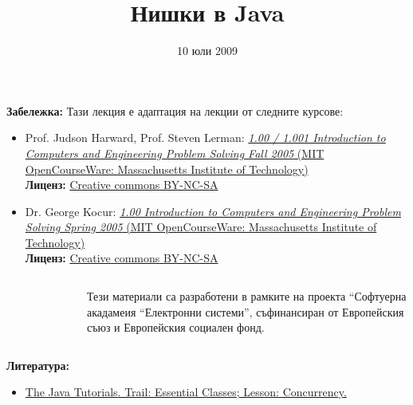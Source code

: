 \documentclass[ignorenonframetext, hyperref=unicode,compress]{beamer}
\title{Нишки в Java}
\date{10 юли 2009}
\begin{document}
\frame{\titlepage}

\begin{frame}
\small
{\bf Забележка:} Тази лекция е адаптация на лекции от следните
курсове:
\begin{itemize}
  \item 
Prof. Judson Harward, Prof. Steven Lerman:
\href{http://ocw.mit.edu/OcwWeb/Civil-and-Environmental-Engineering/1-00Fall-2005/CourseHome/index.htm}{
{\em 1.00 / 1.001 Introduction to Computers and Engineering Problem Solving  Fall 2005} (MIT OpenCourseWare:
Massachusetts Institute of Technology)}\\
{\bf Лиценз:}
\href{http://ocw.mit.edu/OcwWeb/web/terms/terms/index.htm\#cc}{Creative commons
BY-NC-SA}  
\item Dr. George Kocur: 
\href{http://ocw.mit.edu/OcwWeb/Civil-and-Environmental-Engineering/1-00Spring-2005/CourseHome/index.htm}{
{\em 1.00 Introduction to Computers and Engineering Problem
Solving  Spring 2005} (MIT OpenCourseWare: Massachusetts Institute of
Technology)} \\
{\bf Лиценз:}
\href{http://ocw.mit.edu/OcwWeb/web/terms/terms/index.htm\#cc}{Creative commons
BY-NC-SA}
\end{itemize}



\vfill

\begin{columns}
\begin{figure}[h]
\center
{}
\end{figure}

Тези материали са разработени в рамките на проекта ``Софтуерна акадамеия ``Електронни системи'', съфинансиран от Европейския съюз и Европейския социален фонд.
\end{columns}

\end{frame}

\begin{frame}
{\bf Литература:} 
\begin{itemize}
\item
\href{http://java.sun.com/docs/books/tutorial/essential/concurrency/index.html}{The
Java Tutorials. Trail: Essential Classes; Lesson: Concurrency.}
\end{itemize}
\end{frame}
\end{document}
